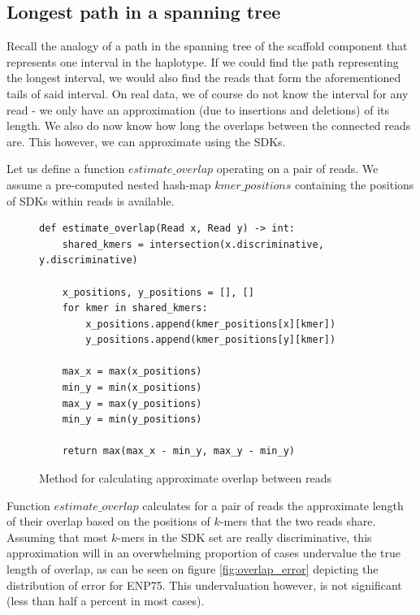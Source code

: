 \subsection{Longest path in a spanning tree}

Recall the analogy of a path in the spanning tree of the scaffold component that represents one interval in the haplotype. If we could find the path representing the longest interval, we would also find the reads that form the aforementioned tails of said interval. On real data, we of course do not know the interval for any read - we only have an approximation (due to insertions and deletions) of its length. We also do now know how long the overlaps between the connected reads are. This however, we can approximate using the SDKs.

Let us define a function $estimate\_overlap$ operating on a pair of reads. We assume a pre-computed nested hash-map $kmer\_positions$ containing the positions of SDKs within reads is available.

\begin{figure}[H]
\lstset{language=Python}
\begin{lstlisting}[basicstyle=\small]
def estimate_overlap(Read x, Read y) -> int:
    shared_kmers = intersection(x.discriminative, y.discriminative)

    x_positions, y_positions = [], []
    for kmer in shared_kmers:
        x_positions.append(kmer_positions[x][kmer])
        y_positions.append(kmer_positions[y][kmer])

    max_x = max(x_positions)
    min_y = min(x_positions)
    max_y = max(y_positions)
    min_y = min(y_positions)

    return max(max_x - min_y, max_y - min_y)
\end{lstlisting}
\caption{Method for calculating approximate overlap between reads}
\label{fig:estimate_overlap}
\end{figure}

Function $estimate\_overlap$ calculates for a pair of reads the approximate length of their overlap based on the positions of $k$-mers that the two reads share. Assuming that most $k$-mers in the SDK set are really discriminative, this approximation will in an overwhelming proportion of cases undervalue the true length of overlap, as can be seen on figure \ref{fig:overlap_error} depicting the distribution of error for ENP75. This undervaluation however, is not significant (less than half a percent in most cases).

